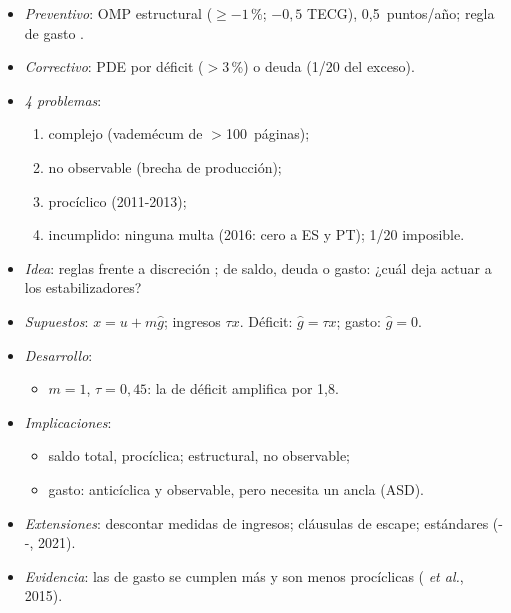 \documentclass{article}
\begin{document}
\begin{columnas}
\begin{itemize}
\item \emph{Preventivo}: OMP estructural ($\geq-1$\,\%; $-0{,}5$ TECG), 0,5~puntos/año; regla de gasto .
\item \emph{Correctivo}: PDE por déficit ($>$3\,\%) o deuda (1/20 del exceso).
\item \emph{4 problemas}:
  \begin{enumerate}
  \item complejo (vademécum de $>$100~páginas);
  \item no observable (brecha de producción);
  \item procíclico (2011-2013);
  \item incumplido: ninguna multa (2016: cero a ES y PT); 1/20 imposible.
  \end{enumerate}
\end{itemize}
\begin{itemize}
\item \emph{Idea}: reglas frente a discreción ; de saldo, deuda o gasto: ¿cuál deja actuar a los estabilizadores?
\item \emph{Supuestos}: $x=u+m\hat g$; ingresos $\tau x$. Déficit: $\hat g=\tau x$; gasto: $\hat g=0$.
\item \emph{Desarrollo}:
  \begin{itemize}
  \item $m=1$, $\tau=0{,}45$: la de déficit amplifica por 1,8.
  \end{itemize}
\item \emph{Implicaciones}:
  \begin{itemize}
  \item saldo total, procíclica; estructural, no observable;
  \item gasto: anticíclica y observable, pero necesita un ancla (ASD).
  \end{itemize}
\item \emph{Extensiones}: descontar medidas de ingresos; cláusulas de escape; estándares (--, 2021).
\item \emph{Evidencia}: las de gasto se cumplen más y son menos procíclicas ( \emph{et al.}, 2015).
\end{itemize}

\end{columnas}
\end{document}
